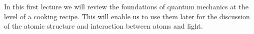 In this first lecture we will review the foundations of quantum mechanics at the level of a cooking recipe. This will enable us to use them later for the discussion of the atomic structure and interaction between atoms and light.